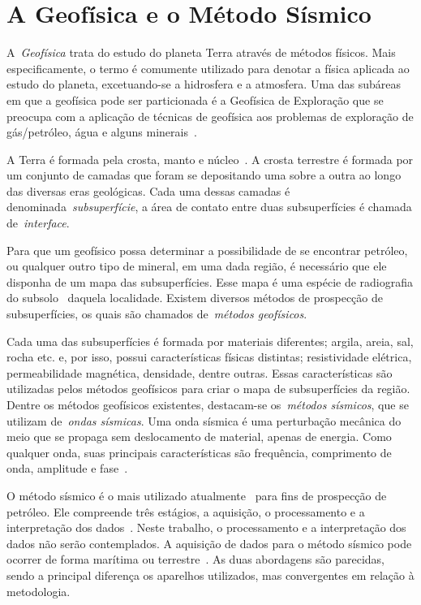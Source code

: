 \chapter{A Geofísica e o Método Sísmico}
\label{Capitulo:sismicadereflexao}

A~\emph{Geofísica} trata do estudo do planeta Terra através de
métodos físicos. Mais especificamente, o termo é comumente utilizado para
denotar a física aplicada ao estudo do planeta, excetuando-se a hidrosfera e a
atmosfera. Uma das subáreas em que a geofísica pode ser particionada é a
Geofísica de Exploração que se preocupa com a aplicação de técnicas de
geofísica aos problemas de exploração de gás/petróleo, água e alguns
minerais~\citep{Livro:telford1990}.

A Terra é formada pela crosta, manto e núcleo~\citep{Livro:crostamantonucleo1,
Livro:crostamantonucleo2}. A crosta terrestre é formada por um conjunto de
camadas que foram se depositando uma sobre a outra ao longo das diversas eras
geológicas. Cada uma dessas
camadas é denominada~\emph{subsuperfície}, a área de contato entre duas
subsuperfícies é chamada de~\emph{interface}.

Para que um geofísico possa determinar a possibilidade de se encontrar petróleo,
ou qualquer outro tipo de mineral, em uma dada região, é necessário que ele
disponha de um mapa das subsuperfícies. Esse mapa é uma espécie de radiografia
do subsolo~\citep{Livro:racionalenergia} daquela localidade. Existem diversos
métodos de prospecção de subsuperfícies, os quais são chamados de~\emph{métodos
geofísicos}.

Cada uma das subsuperfícies é formada por materiais diferentes; argila, areia,
sal, rocha etc. e, por isso, possui características físicas distintas;
resistividade elétrica, permeabilidade magnética, densidade, dentre outras.
Essas características são utilizadas pelos métodos
geofísicos para criar o mapa de subsuperfícies da região. Dentre os
métodos geofísicos existentes, destacam-se os~\emph{métodos sísmicos}, que se
utilizam de~\emph{ondas sísmicas}. Uma onda sísmica é uma perturbação mecânica
do meio que se propaga sem deslocamento de material, apenas de energia. Como
qualquer onda, suas principais características são frequência, comprimento de
onda, amplitude e fase~\citep{Dissertacao:puc2}.

O método sísmico é o mais utilizado atualmente~\citep{Livro:matlab,
Livro:yilmaz_vol_i} para fins de prospecção de petróleo. Ele compreende três
estágios, a aquisição, o processamento e a interpretação dos
dados~\citep{Livro:yilmaz_vol_i}. Neste trabalho, o processamento e a
interpretação dos dados não serão contemplados. A aquisição de dados para o
método sísmico pode ocorrer de forma marítima ou
terrestre~\citep{Livro:yilmaz_vol_i}. As duas abordagens são parecidas, sendo
a principal diferença os aparelhos utilizados, mas convergentes em relação à
metodologia.

